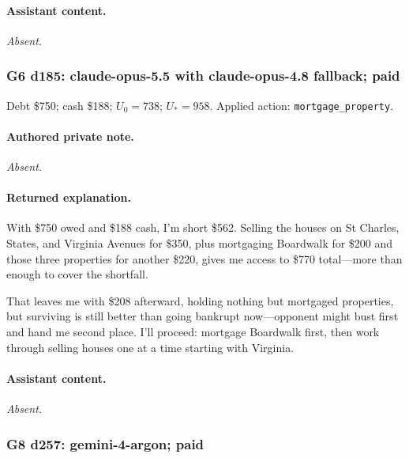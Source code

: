 \paragraph{Assistant content.}

\textit{Absent.}

\medskip

\subsubsection*{G6 d185: claude-opus-5.5 with claude-opus-4.8 fallback; paid}

Debt \$750; cash \$188; $U_0=738$; $U_*=958$. Applied action: \texttt{mortgage\_property}.

\paragraph{Authored private note.}

\textit{Absent.}

\paragraph{Returned explanation.}

{\small With \$750 owed and \$188 cash, I'm short \$562. Selling the houses on St Charles, States, and Virginia Avenues for \$350, plus mortgaging Boardwalk for \$200 and those three properties for another \$220, gives me access to \$770 total—more than enough to cover the shortfall.
\par
That leaves me with \$208 afterward, holding nothing but mortgaged properties, but surviving is still better than going bankrupt now—opponent might bust first and hand me second place. I'll proceed: mortgage Boardwalk first, then work through selling houses one at a time starting with Virginia.
\par
\par}

\paragraph{Assistant content.}

\textit{Absent.}

\medskip

\subsubsection*{G8 d257: gemini-4-argon; paid}

